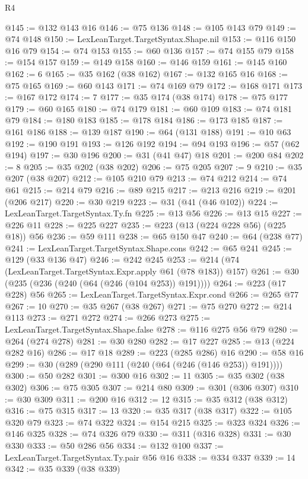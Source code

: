 \begin{lexlean}{R4}
\begin{coremodule}
@145 := @132 @143 @16
@146 := @75 @136
@148 := @105 @143 @79
@149 := @74 @148
@150 := LexLeanTarget.TargetSyntax.Shape.nil
@153 := @116 @150 @16 @79
@154 := @74 @153
@155 := @60 @136
@157 := @74 @155 @79
@158 := @154 @157
@159 := @149 @158
@160 := @146 @159
@161 := @145 @160
@162 := 6
@165 := @35 @162 (@38 @162)
@167 := @132 @165 @16
@168 := @75 @165
@169 := @60 @143
@171 := @74 @169 @79
@172 := @168 @171
@173 := @167 @172
@174 := 7
@177 := @35 @174 (@38 @174)
@178 := @75 @177
@179 := @60 @165
@180 := @74 @179
@181 := @60 @109
@183 := @74 @181 @79
@184 := @180 @183
@185 := @178 @184
@186 := @173 @185
@187 := @161 @186
@188 := @139 @187
@190 := @64 (@131 @188)
@191 := @10 @63
@192 := @190 @191
@193 := @126 @192
@194 := @94 @193
@196 := @57 (@62 @194)
@197 := @30 @196
@200 := @31 (@41 @47) @18
@201 := @200 @84
@202 := 8
@205 := @35 @202 (@38 @202)
@206 := @75 @205
@207 := 9
@210 := @35 @207 (@38 @207)
@212 := @105 @210 @79
@213 := @74 @212
@214 := @74 @61
@215 := @214 @79
@216 := @89 @215
@217 := @213 @216
@219 := @201 (@206 @217)
@220 := @30 @219
@223 := @31 (@41 (@46 @102))
@224 := LexLeanTarget.TargetSyntax.Ty.fn
@225 := @13 @56
@226 := @13 @15
@227 := @226 @11
@228 := @225 @227
@235 := @223 (@13 (@224 @228 @56) (@225 @18)) @56
@236 := @59 @111
@238 := @65 @150 @47
@240 := @64 (@238 @77)
@241 := LexLeanTarget.TargetSyntax.Shape.cons
@242 := @65 @241
@245 := @129 (@33 @136 @47)
@246 := @242 @245
@253 := @214 (@74 (LexLeanTarget.TargetSyntax.Expr.apply @61 (@78 @183)) @157)
@261 := @30 (@235 (@236 (@240 (@64 (@246 (@104 @253)) @191))))
@264 := @223 (@17 @228) @56
@265 := LexLeanTarget.TargetSyntax.Expr.cond
@266 := @265 @77
@267 := 10
@270 := @35 @267 (@38 @267)
@271 := @75 @270
@272 := @214 @113
@273 := @271 @272
@274 := @266 @273
@275 := LexLeanTarget.TargetSyntax.Shape.false
@278 := @116 @275 @56 @79
@280 := @264 (@274 @278)
@281 := @30 @280
@282 := @17 @227
@285 := @13 (@224 @282 @16)
@286 := @17 @18
@289 := @223 (@285 @286) @16
@290 := @58 @16
@299 := @30 (@289 (@290 @111 (@240 (@64 (@246 (@146 @253)) @191))))
@300 := @50 @282
@301 := @300 @16
@302 := 11
@305 := @35 @302 (@38 @302)
@306 := @75 @305
@307 := @214 @80
@309 := @301 (@306 @307)
@310 := @30 @309
@311 := @200 @16
@312 := 12
@315 := @35 @312 (@38 @312)
@316 := @75 @315
@317 := 13
@320 := @35 @317 (@38 @317)
@322 := @105 @320 @79
@323 := @74 @322
@324 := @154 @215
@325 := @323 @324
@326 := @146 @325
@328 := @74 @326 @79
@330 := @311 (@316 @328)
@331 := @30 @330
@333 := @50 @286 @56
@334 := @132 @100
@337 := LexLeanTarget.TargetSyntax.Ty.pair @56 @16
@338 := @334 @337
@339 := 14
@342 := @35 @339 (@38 @339)

\end{coremodule}
\end{lexlean}
